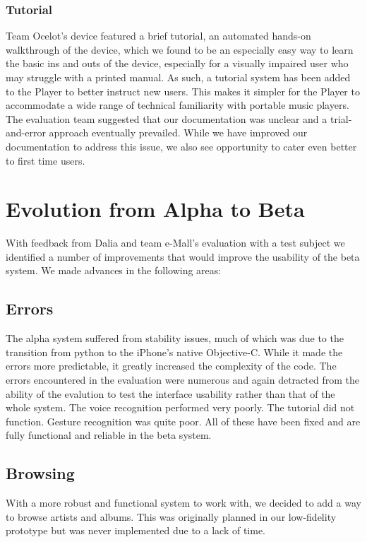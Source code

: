 \documentclass[10pt,letterpaper]{article}
\begin{document}
\subsubsection*{Tutorial}
Team Ocelot's device featured a brief tutorial, an automated hands-on walkthrough of the device, which we found to be an especially easy way to learn the basic ins and outs of the device, especially for a visually impaired user who may struggle with a printed manual. As such, a tutorial system has been added to the Player to better instruct new users. This makes it simpler for the Player to accommodate a wide range of technical familiarity with portable music players. The evaluation team suggested that our documentation was unclear and a trial-and-error approach eventually prevailed. While we have improved our documentation to address this issue, we also see opportunity to cater even better to first time users.

\section*{Evolution from Alpha to Beta}
With feedback from Dalia and team e-Mall's evaluation with a test subject we identified a number of improvements that would improve the usability of the beta system. We made advances in the following areas:
\subsection*{Errors}
The alpha system suffered from stability issues, much of which was due to the transition from python to the iPhone's native Objective-C. While it made the errors more predictable, it greatly increased the complexity of the code. The errors encountered in the evaluation were numerous and again detracted from the ability of the evalution to test the interface usability rather than that of the whole system. The voice recognition performed very poorly. The tutorial did not function. Gesture recognition was quite poor. All of these have been fixed and are fully functional and reliable in the beta system.

\subsection*{Browsing}
With a more robust and functional system to work with, we decided to add a way to browse artists and albums. This was originally planned in our low-fidelity prototype but was never implemented due to a lack of time. 
\end{document}
